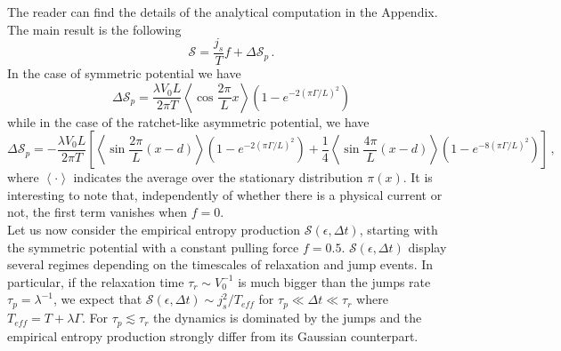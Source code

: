 \documentclass[12pt]{iopart}
\newcommand{\lx} {\left}
\newcommand{\rx} {\right}
\newcommand{\ave}[1] {\lx\langle #1 \rx\rangle}
\newcommand{\cS} {\mathcal{S}}
\begin{document}
The reader can find the details of the analytical computation in the Appendix.
The main result is the following 
\begin{equation}
\cS=\frac{j_s}{T}f + \Delta \cS_p\,.
\end{equation}
In the case of symmetric potential we have
\begin{equation}
\Delta \cS_p = \frac{\lambda V_0 L}{2\pi T}\ave{\cos{\frac{2\pi}{L}x}} \lx(1-e^{-2\lx(\pi \Gamma/L\rx)^2}\rx)
\end{equation}
while in the case of the ratchet-like asymmetric potential, we have
\begin{equation}
\Delta \cS_p =-\frac{\lambda V_0 L}{2\pi T}\lx[\ave{\sin{\frac{2\pi}{L}(x-d)}} \lx(1-e^{-2\lx(\pi \Gamma/L\rx)^2}\rx)+\frac{1}{4}\ave{\sin{\frac{4\pi}{L}(x-d)}} \lx(1-e^{-8\lx(\pi \Gamma/L\rx)^2}\rx)\rx]\,,
\end{equation}
where $\ave{\cdot}$ indicates the average over the stationary distribution $\pi(x)$.
It is interesting to note that, independently of whether there is a physical current or not, the first term vanishes when $f=0$. \\
Let us now consider the empirical entropy production $\cS(\epsilon,\Delta t)$, starting with the symmetric potential with a constant pulling force $f=0.5$. $\cS(\epsilon,\Delta t)$ display several regimes depending on the timescales of relaxation and jump events. In particular, if the relaxation time $\tau_r\sim V_0^{-1}$ is much bigger than the jumps rate $\tau_p=\lambda^{-1}$, we expect that $\cS(\epsilon,\Delta t)\sim j_s^2/T_{eff}$  for $\tau_p\ll\Delta t \ll \tau_r$ where $T_{eff}=T+\lambda\Gamma$. For $\tau_p\lesssim \tau_r$ the dynamics is dominated by the jumps and the empirical entropy production strongly differ from its Gaussian counterpart. 
\end{document}
